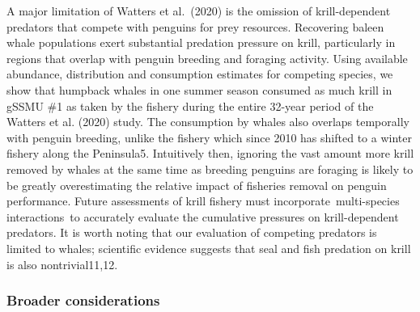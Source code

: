 \documentclass[]{elsarticle} %
\begin{document}
A major limitation of Watters et al.~(2020) is the omission of
krill-dependent predators that compete with penguins for prey resources.
Recovering baleen whale populations exert substantial predation pressure
on krill, particularly in regions that overlap with penguin breeding and
foraging activity. Using available abundance, distribution and
consumption estimates for competing species, we show that humpback
whales in one summer season consumed as much krill in gSSMU \#1 as taken
by the fishery during the entire 32-year period of the Watters et al.
(2020) study. The consumption by whales also overlaps temporally with
penguin breeding, unlike the fishery which since 2010 has shifted to a
winter fishery along the Peninsula5. Intuitively then, ignoring the vast
amount more krill removed by whales at the same time as breeding
penguins are foraging is likely to be greatly overestimating the
relative impact of fisheries removal on penguin performance. Future
assessments of krill fishery must incorporate~multi-species
interactions~to accurately evaluate the cumulative pressures on
krill-dependent predators. It is worth noting that our evaluation of
competing predators is limited to whales; scientific evidence suggests
that seal and fish predation on krill is also nontrivial11,12.

\subsubsection{Broader considerations}\label{broader-considerations}
\end{document}
